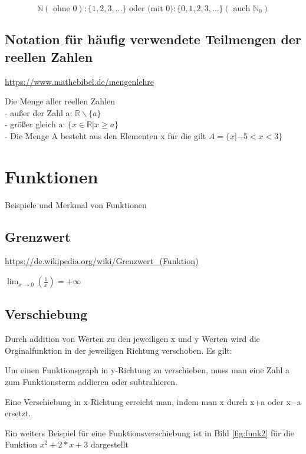 \documentclass[]{book}
\begin{document}
\[\mathbb { N } ( \text { ohne } 0 ) : \{ 1,2,3 , \ldots \} \text { oder (mit } 0 ) : \{ 0,1,2,3 , \ldots \} \left( \text { auch } \mathbb { N } _ { 0 } \right)\]

\section{Notation für häufig verwendete Teilmengen der reellen
Zahlen}\label{notation-fur-haufig-verwendete-teilmengen-der-reellen-zahlen}

\url{https://www.mathebibel.de/mengenlehre}

Die Menge aller reellen Zahlen\\
- außer der Zahl a: \textbf{\(\mathbb { R } \backslash \{ a \}\)}\\
- größer gleich a: \(\{ x \in \mathbb { R } | x \geq a \}\)\\
- Die Menge A besteht aus den Elementen x für die gilt
\(A = \{ x | - 5 < x < 3 \}\)

\chapter{Funktionen}\label{funktionen}

Beispiele und Merkmal von Funktionen

\section{Grenzwert}\label{grenzwert}

\url{https://de.wikipedia.org/wiki/Grenzwert_(Funktion)}

\(\lim _ { x \rightarrow 0 } \left( \frac { 1 } { x } \right) = + \infty\)

\section{Verschiebung}\label{verschiebung}

Durch addition von Werten zu den jeweiligen x und y Werten wird die
Orginalfunktion in der jeweiligen Richtung verschoben. Es gilt:

Um einen Funktionsgraph in y-Richtung zu verschieben, muss man eine Zahl
a zum Funktionsterm addieren oder subtrahieren.

Eine Verschiebung in x-Richtung erreicht man, indem man x durch x+a oder
x−a ersetzt.

Ein weiters Beispiel für eine Funktionsverschiebung ist in Bild
\ref{fig:funk2} für die Funktion \(x^2+2*x+3\) dargestellt
\end{document}
